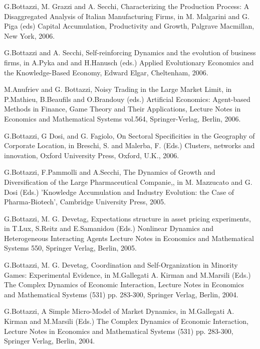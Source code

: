 \documentclass[a4paper]{article}
\begin{document}
G.Bottazzi, M. Grazzi and A. Secchi, Characterizing the Production
Process: A Disaggregated Analysis of Italian Manufacturing Firms, in
M. Malgarini and G. Piga (eds) \textquotedbl{}Capital Accumulation, Productivity and
Growth\textquotedbl{}, Palgrave Macmillan, New York, 2006.

G.Bottazzi and A. Secchi, Self-reinforcing Dynamics and the evolution
of business firms, in A.Pyka and and H.Hanusch (eds.) \textquotedbl{}Applied
Evolutionary Economics and the Knowledge-Based Economy\textquotedbl{}, Edward Elgar,
Cheltenham, 2006.

M.Anufriev and G. Bottazzi, Noisy Trading in the Large Market Limit,
in P.Mathieu, B.Beaufils and O.Brandouy (eds.)  \textquotedbl{}Artificial Economics:
Agent-based Methods in Finance, Game Theory and Their Applications\textquotedbl{},
Lecture Notes in Economics and Mathematical Systems vol.564,
Springer-Verlag, Berlin, 2006.

G.Bottazzi, G Dosi, and G. Fagiolo, On Sectoral Specificities in the
Geography of Corporate Location, in Breschi, S. and Malerba, F.
(Eds.) \textquotedbl{}Clusters, networks and innovation\textquotedbl{}, Oxford University Press,
Oxford, U.K., 2006.

G.Bottazzi, F.Pammolli and A.Secchi, The Dynamics of Growth and
Diversification of the Large Pharmaceutical Companie,, in M.
Mazzucato and G.  Dosi (Eds.) 'Knowledge Accumulation and Industry
Evolution: the Case of Pharma-Biotech', Cambridge University Press,
2005.

G.Bottazzi, M. G. Devetag, Expectations structure in asset pricing
experiments, in T.Lux, S.Reitz and E.Samanidou (Eds.)  \textquotedbl{}Nonlinear
Dynamics and Heterogeneous Interacting Agents\textquotedbl{} Lecture Notes in
Economics and Mathematical Systems 550, Springer Verlag, Berlin, 2005.

G.Bottazzi, M. G. Devetag, Coordination and Self-Organization in
Minority Games: Experimental Evidence, in M.Gallegati A. Kirman and
M.Marsili (Eds.) \textquotedbl{}The Complex Dynamics of Economic Interaction\textquotedbl{},
Lecture Notes in Economics and Mathematical Systems (531) pp. 283-300,
Springer Verlag, Berlin, 2004.

G.Bottazzi, A Simple Micro-Model of Market Dynamics, in
M.Gallegati A. Kirman and M.Marsili (Eds.) \textquotedbl{}The Complex Dynamics of
Economic Interaction\textquotedbl{}, Lecture Notes in Economics and Mathematical
Systems (531) pp. 283-300, Springer Verlag, Berlin, 2004.
\end{document}
